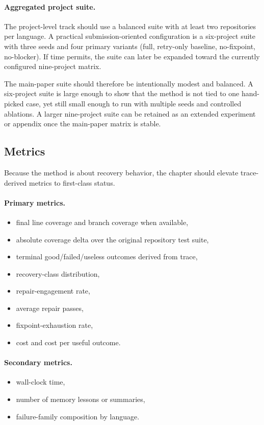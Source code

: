 \documentclass[10pt]{article}
\begin{document}
\paragraph{Aggregated project suite.}
The project-level track should use a balanced suite with at least two repositories per language. A practical submission-oriented configuration is a six-project suite with three seeds and four primary variants (full, retry-only baseline, no-fixpoint, no-blocker). If time permits, the suite can later be expanded toward the currently configured nine-project matrix.

The main-paper suite should therefore be intentionally modest and balanced. A six-project suite is large enough to show that the method is not tied to one hand-picked case, yet still small enough to run with multiple seeds and controlled ablations. A larger nine-project suite can be retained as an extended experiment or appendix once the main-paper matrix is stable.

\subsection{Metrics}

Because the method is about recovery behavior, the chapter should elevate trace-derived metrics to first-class status.

\paragraph{Primary metrics.}
\begin{itemize}[leftmargin=1.4em]
    \item final line coverage and branch coverage when available,
    \item absolute coverage delta over the original repository test suite,
    \item terminal good/failed/useless outcomes derived from trace,
    \item recovery-class distribution,
    \item repair-engagement rate,
    \item average repair passes,
    \item fixpoint-exhaustion rate,
    \item cost and cost per useful outcome.
\end{itemize}

\paragraph{Secondary metrics.}
\begin{itemize}[leftmargin=1.4em]
    \item wall-clock time,
    \item number of memory lessons or summaries,
    \item failure-family composition by language.
\end{itemize}
\end{document}
